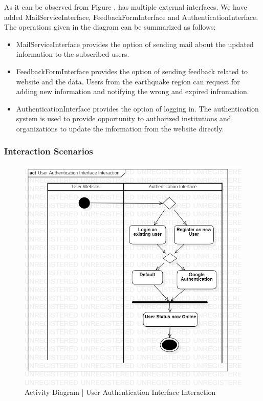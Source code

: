 As it can be observed from Figure , \afetbilgi has multiple external interfaces. We have added MailServiceInterface, FeedbackFormInterface and AuthenticationInterface. The operations given in the diagram can be summarized as follows:
\begin{itemize}
  \item MailServiceInterface provides the option of sending mail about the updated information to the subscribed users.
  \item FeedbackFormInterface provides the option of sending feedback related to website and the data. Users from the earthquake region can request for adding new information and notifying the wrong and expired infromation.
  \item AuthenticationInterface provides the option of logging in. The authentication system is used to provide opportunity to authorized institutions and organizations to update the information from the website directly.
\end{itemize}

\subsubsection{Interaction Scenarios}

\begin{figure}[H]
  \centering
  \includegraphics[width=\linewidth]{img/activity-diagram-1-s5.jpg}
  \caption{Activity Diagram | User Authentication Interface Interaction}
\end{figure}

